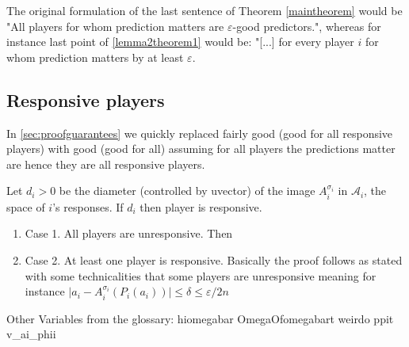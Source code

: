 \documentclass[]{spie}  %
\begin{document}
The original formulation of the last sentence of Theorem \autoref{maintheorem} would be "All players for whom prediction matters are $\varepsilon$-good predictors.", whereas for instance last point of \autoref{lemma2theorem1} would be: "[...] for every player $i$ for whom prediction matters by at least $\varepsilon$.

\subsection{Responsive players}
In \autoref{sec:proofguarantees} we quickly replaced fairly good (good for all responsive players) with good (good for all) assuming for all players the predictions matter are hence they are all responsive players.

Let $d_i > 0$ be the diameter (controlled by \gls{uvector}) of the image $A_i^{\sigma_i}$ in $\mathcal{A}_i$, the space of $i$'s responses. If $d_i$ then player is responsive.

\begin{enumerate}
    \item Case 1. All players are unresponsive. Then
    \item Case 2. At least one player is responsive. Basically the proof follows as stated with some technicalities that some players are unresponsive meaning for instance $ \lvert a_i - A_i^{\sigma_i}(P_i(a_i)) \rvert \leq \delta \leq \varepsilon/2n$
\end{enumerate}

Other Variables from the glossary: \gls{hiomegabar} \gls{OmegaOfomegabart} \gls{weirdo} \gls{ppit} \gls{v_ai_phii}
\end{document}
